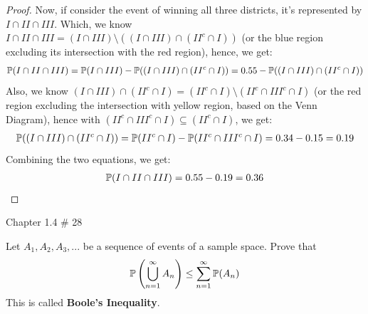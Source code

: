\documentclass{article}
\begin{document}
\begin{proof}
    Now, if consider the event of winning all three districts, it's represented by $I\cap II\cap III$. Which, we know $I\cap II\cap III = (I\cap III)\setminus ((I\cap III)\cap (II^c \cap I))$ (or the blue region excluding its intersection with the red region), hence, we get:
    \begin{align}
        \mathbb{P}(I\cap II\cap III) = \mathbb{P}(I\cap III)-\mathbb{P}((I\cap III)\cap (II^c\cap I)) = 0.55 -\mathbb{P}((I\cap III)\cap (II^c\cap I))
    \end{align}
    Also, we know $(I\cap III)\cap (II^c\cap I) = (II^c\cap I)\setminus (II^c\cap III^c\cap I)$ (or the red region excluding the intersection with yellow region, based on the Venn Diagram), hence with $(II^c\cap III^c\cap I)\subseteq (II^c\cap I)$, we get:
    \begin{align}
        \mathbb{P}((I\cap III)\cap (II^c\cap I)) = \mathbb{P}(II^c\cap I)-\mathbb{P}(II^c\cap III^c\cap I) = 0.34 - 0.15 = 0.19
    \end{align}
    Combining the two equations, we get:
    \begin{align}
        \mathbb{P}(I\cap II\cap III)=0.55 - 0.19 = 0.36
    \end{align}
\end{proof}

\newpage

\begin{ques}\label{q9}
    Chapter 1.4 \# 28

    Let $A_1,A_2,A_3,...$ be a sequence of events of a sample space. Prove that 
    $$\mathbb{P}\left(\bigcup_{n=1}^\infty A_n\right)\leq \sum_{n=1}^\infty \mathbb{P}(A_n)$$
    This is called \textbf{Boole's Inequality}.
\end{ques}
\end{document}
